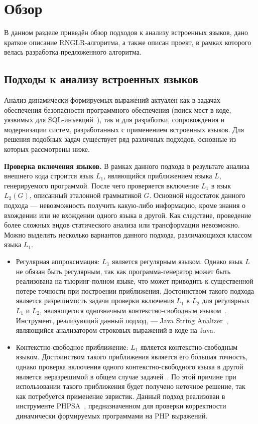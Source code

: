 \section{Обзор}
В данном разделе приведён обзор подходов к анализу встроенных языков, дано краткое описание RNGLR-алгоритма, а также описан проект, в рамках которого велась разработка предложенного алгоритма.

\subsection{Подходы к анализу встроенных языков}\label{SELAnalysisDescr}

Анализ динамически формируемых выражений актуален как в задачах обеспечения безопасности программного обеспечения (поиск мест в коде, уязвимых для SQL-инъекций~\cite{SQLInjection}), так и для разработки, сопровождения и модернизации систем, разработанных с применением встроенных языков. Для решения подобных задач существует ряд различных подходов, основные из которых рассмотрены ниже.

\textbf{Проверка включения языков.} В рамках данного подхода в результате анализа внешнего кода строится язык $L_1$, являющийся приближением языка $L$, генерируемого программой. После чего проверяется включение $L_1$ в язык $L_2(G)$, описанный эталонной грамматикой $G$. Основной недостаток данного подхода --- невозможность получить какую-либо информацию, кроме знания о вхождении или не вхождении одного языка в другой. Как следствие, проведение более сложных видов статического анализа или трансформации невозможно. Можно выделить несколько вариантов данного подхода, различающихся классом языка $L_1$.

\begin{itemize}
    \item Регулярная аппроксимация: $L_1$ является регулярным языком. Однако язык $L$ не обязан быть регулярным, так как программа-генератор может быть реализована на тьюринг-полном языке, что может приводить к существенной потере точности при построении приближения. Достоинством такого подхода является разрешимость задачи проверки включения $L_1$ в $L_2$ для регулярных $L_1$ и $L_2$, являющегося однозначным контекстно-свободным языком~\cite{LangInclusion}. Инструмент, реализующий данный подход, --- Java String Analizer~\cite{JSA}, являющийся анализатором строковых выражений в коде на Java.

    \item Контекстно-свободное приближение: $L_1$ является контекстно-свободным языком.  Достоинством такого приближения является его б\'{о}льшая точность, однако проверка включения одного контекстно-свободного языка в другой является неразрешимой в общем случае задачей~\cite{LangInclusion}. По  этой причине при использовании такого приближения будет получено неточное решение, так как потребуется применение эвристик. Данный подход реализован в инструменте PHPSA~\cite{PHPSA}, предназначенном для проверки корректности динамически формируемых программами на PHP выражений.

\end{itemize}

